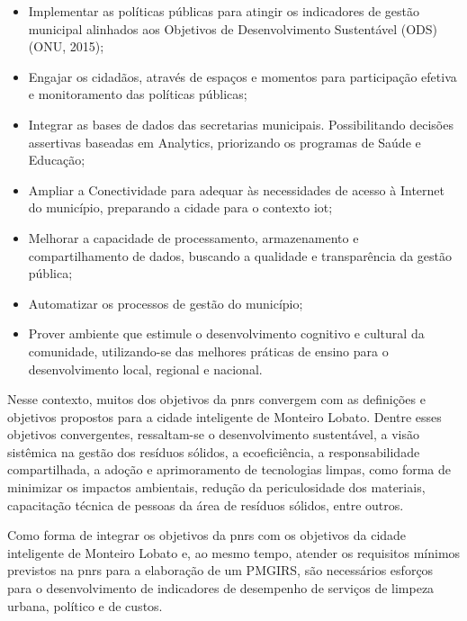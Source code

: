 	\begin{itemize}
		\item Implementar as políticas públicas para atingir os indicadores de gestão municipal alinhados aos Objetivos de Desenvolvimento Sustentável (ODS) (ONU, 2015);
	
		\item Engajar os cidadãos, através de espaços e momentos para participação efetiva e monitoramento das políticas públicas;
	
		\item Integrar as bases de dados das secretarias municipais. Possibilitando decisões assertivas baseadas em Analytics, priorizando os programas de Saúde e Educação;
	
		\item Ampliar a Conectividade para adequar às necessidades de acesso à Internet do município, preparando a cidade para o contexto \gls{iot};
	
		\item Melhorar a capacidade de processamento, armazenamento e compartilhamento de dados, buscando a qualidade e transparência da gestão pública;
	
		\item Automatizar os processos de gestão do município;
	
		\item Prover ambiente que estimule o desenvolvimento cognitivo e cultural da comunidade, utilizando-se das melhores práticas de ensino para o desenvolvimento local, regional e nacional.
	\end{itemize}
	
	Nesse contexto, muitos dos objetivos da \gls{pnrs} \cite{brasil:12305} convergem com as definições e objetivos propostos para a cidade inteligente de Monteiro Lobato. Dentre esses objetivos convergentes, ressaltam-se o desenvolvimento sustentável, a visão sistêmica na gestão dos resíduos sólidos, a ecoeficiência, a responsabilidade compartilhada, a adoção e aprimoramento de tecnologias limpas, como forma de minimizar os impactos ambientais, redução da periculosidade dos materiais, capacitação técnica de pessoas da área de resíduos sólidos, entre outros. 
	
	Como forma de integrar os objetivos da \gls{pnrs} com os objetivos da cidade inteligente de Monteiro Lobato e, ao mesmo tempo, atender os requisitos mínimos previstos na \gls{pnrs} para a elaboração de um PMGIRS, são necessários esforços para o desenvolvimento de indicadores de desempenho de serviços de limpeza urbana, político e de custos. 
	
